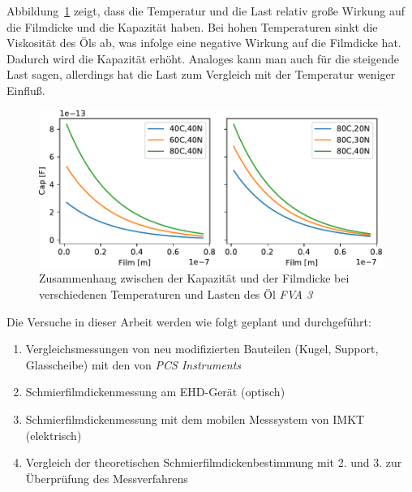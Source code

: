 Abbildung~\ref{fig:film_cap_with_dif_temp_and_load} zeigt, dass die Temperatur und die Last relativ große Wirkung auf die Filmdicke und die Kapazität haben.
Bei hohen Temperaturen sinkt die Viskosität des Öls ab, was infolge eine negative Wirkung auf die Filmdicke hat.
Dadurch wird die Kapazität erhöht.
Analoges kann man auch für die steigende Last sagen, allerdings hat die Last zum Vergleich mit der Temperatur weniger Einfluß.
\begin{figure}[htb]
    \centering
    \includegraphics[]{./images/film_cap_with_dif_temp_and_load_fva3.pdf}
    \caption{Zusammenhang zwischen der Kapazität und der Filmdicke bei verschiedenen Temperaturen und Lasten des Öl \textit{FVA 3}}
    \label{fig:film_cap_with_dif_temp_and_load}
\end{figure}

Die Versuche in dieser Arbeit werden wie folgt geplant und durchgeführt:
\begin{enumerate}
    \item Vergleichsmessungen von neu modifizierten Bauteilen (Kugel, Support, Glasscheibe) mit den von \textit{PCS Instruments}
    \item Schmierfilmdickenmessung am EHD-Gerät (optisch)
    \item Schmierfilmdickenmessung mit dem mobilen Messsystem von IMKT (elektrisch)
    \item Vergleich der theoretischen Schmierfilmdickenbestimmung mit 2. und 3. zur Überprüfung des Messverfahrens
\end{enumerate}

